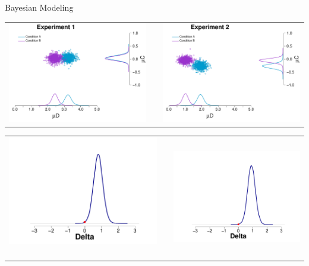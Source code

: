 \documentclass[final]{beamer}
\newlength{\onecolwid}
\newlength{\twocolwid}
\begin{document}
\begin{frame}[t]
\begin{columns}[t]
\begin{column}{\twocolwid}
\begin{columns}[t,totalwidth=\twocolwid]
\begin{column}{\onecolwid}
\begin{alertblock}{Bayesian Modeling}
\begin{enumerate}
\begin{center}
\begin{tabular}{ccc}
\includegraphics[width=0.45\linewidth]{Figures/Modelo_Delta_MeanDC_1.pdf} & \hfill & \includegraphics[width=0.45\linewidth]{Figures/Modelo_Delta_MeanDC_2.pdf}
\end{tabular}
\end{center}

\begin{center}
\begin{tabular}{ccc}
\includegraphics[width=0.35\linewidth]{Figures/Delta_1.pdf}  $\qquad$ $\qquad$ & \hfill & \includegraphics[width=0.35\linewidth]{Figures/Delta_2.pdf}
\end{tabular}
\end{center}



$\qquad$



\end{enumerate}
\end{alertblock}
\end{column}
\end{columns}
\end{column}
\end{columns}
\end{frame}
\end{document}
